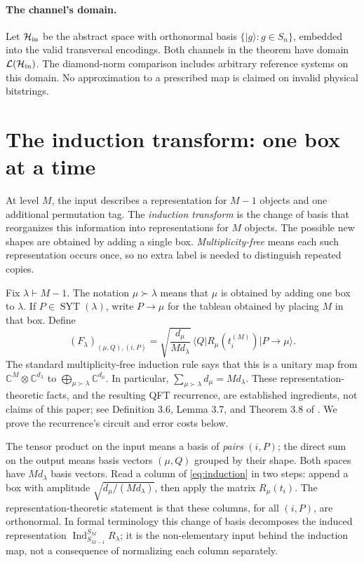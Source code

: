 \documentclass[11pt]{article}
\theoremstyle{definition}
\newcommand{\ket}[1]{\lvert #1\rangle}
\newcommand{\bra}[1]{\langle #1\rvert}
\newcommand{\SYT}{\operatorname{SYT}}
\begin{document}
\paragraph{The channel's domain.}
Let $\mathcal H_{\rm in}$ be the abstract space with orthonormal basis
$\{\ket g:g\in S_n\}$, embedded into the valid transversal encodings.
Both channels in the theorem have domain $\mathcal L(\mathcal H_{\rm in})$.
The diamond-norm comparison includes arbitrary reference systems on this
domain. No approximation to a prescribed map is claimed on invalid
physical bitstrings.

\section{The induction transform: one box at a time}\label{sec:induction}

At level $M$, the input describes a representation for $M-1$ objects
and one additional permutation tag. The \emph{induction transform} is the change of
basis that reorganizes this information into representations for $M$
objects. The possible new shapes are obtained by adding a single box.
\emph{Multiplicity-free} means each such representation occurs once,
so no extra label is needed to distinguish repeated copies.

Fix $\lambda\vdash M-1$. The notation $\mu\succ\lambda$ means that $\mu$
is obtained by adding one box to $\lambda$. If $P\in\SYT(\lambda)$, write
$P\to\mu$ for the tableau obtained by placing $M$ in that box. Define
\begin{equation}\label{eq:induction}
 (F_\lambda)_{(\mu,Q),(i,P)}=
 \sqrt{\frac{d_\mu}{M d_\lambda}}\,
 \bra Q R_\mu(t_i^{(M)})\ket{P\to\mu}.
\end{equation}
The standard multiplicity-free induction rule says that this is a unitary
map from $\mathbb C^M\otimes\mathbb C^{d_\lambda}$ to
$\bigoplus_{\mu\succ\lambda}\mathbb C^{d_\mu}$. In particular,
$\sum_{\mu\succ\lambda}d_\mu=M d_\lambda$. These representation-theoretic
facts, and the resulting QFT recurrence, are established ingredients, not
claims of this paper; see Definition 3.6, Lemma 3.7, and Theorem 3.8 of
\cite{bgo}. We prove the recurrence's circuit and error costs below.

The tensor product on the input means a basis of \emph{pairs} $(i,P)$;
the direct sum on the output means basis vectors $(\mu,Q)$ grouped by
their shape. Both spaces have $M d_\lambda$ basis vectors. Read a column
of \eqref{eq:induction} in two steps: append a box with amplitude
$\sqrt{d_\mu/(M d_\lambda)}$, then apply the matrix $R_\mu(t_i)$.
The representation-theoretic statement is that these columns, for all
$(i,P)$, are orthonormal. In formal terminology this change of basis
decomposes the induced representation
$\operatorname{Ind}_{S_{M-1}}^{S_M}R_\lambda$; it is the non-elementary
input behind the induction map, not a consequence of normalizing each
column separately.
\end{document}
